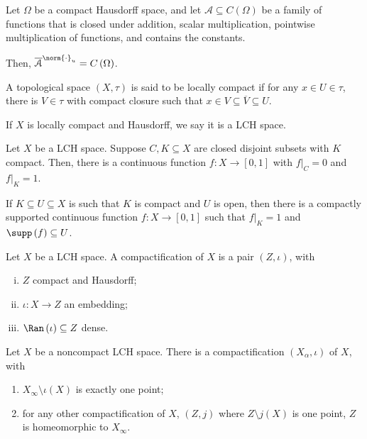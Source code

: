 \begin{theorem}\label{thm:stone_weierstrass}
  Let $\Omega$ be a compact Hausdorff space, and let $\mathcal{A}\subseteq C\left( \Omega \right)$ be a family of functions that is closed under addition, scalar multiplication, pointwise multiplication of functions, and contains the constants.\newline

  Then, $\overline{\mathcal{A}}^{\norm{\cdot}_{u}} = C\left( \Omega \right)$.
\end{theorem}
\begin{definition}
  A topological space $\left(X,\tau\right)$ is said to be locally compact if for any $x\in U\in \tau$, there is $V\in \tau$ with compact closure such that $x\in V\subseteq \overline{V}\subseteq U$.\newline

  If $X$ is locally compact and Hausdorff, we say it is a LCH space.
\end{definition}
\begin{theorem}
  Let $X$ be a LCH space. Suppose $C,K\subseteq X$ are closed disjoint subsets with $K$ compact. Then, there is a continuous function $f\colon X\rightarrow [0,1]$ with $f|_{C} = 0$ and $f|_{K} = 1$.\newline

  If $K\subseteq U\subseteq X$ is such that $K$ is compact and $U$ is open, then there is a compactly supported continuous function $f\colon X\rightarrow [0,1]$ such that $f|_{K} = 1$ and $\supp\left(f\right)\subseteq U$.
\end{theorem}
\begin{definition}
  Let $X$ be a LCH space. A compactification of $X$ is a pair $\left(Z,\iota\right)$, with
  \begin{enumerate}[(i)]
    \item $Z$ compact and Hausdorff;
    \item $\iota\colon X\rightarrow Z$ an embedding;
    \item $\Ran\left(\iota\right)\subseteq Z$ dense.
  \end{enumerate}
\end{definition}
\begin{theorem}
  Let $X$ be a noncompact LCH space. There is a compactification $\left(X_{\alpha},\iota\right)$ of $X$, with
  \begin{enumerate}[(1)]
    \item $X_{\infty}\setminus \iota(X)$ is exactly one point;
    \item for any other compactification of $X$, $\left(Z,j\right)$ where $Z\setminus j(X)$ is one point, $Z$ is homeomorphic to $X_{\infty}$.
  \end{enumerate}
\end{theorem}
